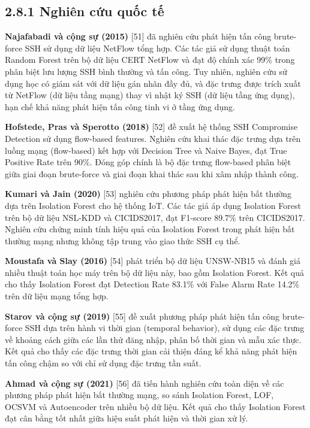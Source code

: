 \documentclass[
  a4paper]{report}
\begin{document}
\subsection{2.8.1 Nghiên cứu quốc
tế}\label{nghiuxean-cux1ee9u-quux1ed1c-tux1ebf}

\textbf{Najafabadi và cộng sự (2015)} {[}51{]} đã nghiên cứu phát hiện
tấn công brute-force SSH sử dụng dữ liệu NetFlow tổng hợp. Các tác giả
sử dụng thuật toán Random Forest trên bộ dữ liệu CERT NetFlow và đạt độ
chính xác 99\% trong phân biệt lưu lượng SSH bình thường và tấn công.
Tuy nhiên, nghiên cứu sử dụng học có giám sát với dữ liệu gán nhãn đầy
đủ, và đặc trưng được trích xuất từ NetFlow (dữ liệu tầng mạng) thay vì
nhật ký SSH (dữ liệu tầng ứng dụng), hạn chế khả năng phát hiện tấn công
tinh vi ở tầng ứng dụng.

\textbf{Hofstede, Pras và Sperotto (2018)} {[}52{]} đề xuất hệ thống SSH
Compromise Detection sử dụng flow-based features. Nghiên cứu khai thác
đặc trưng dựa trên luồng mạng (flow-based) kết hợp với Decision Tree và
Naive Bayes, đạt True Positive Rate trên 90\%. Đóng góp chính là bộ đặc
trưng flow-based phân biệt giữa giai đoạn brute-force và giai đoạn khai
thác sau khi xâm nhập thành công.

\textbf{Kumari và Jain (2020)} {[}53{]} nghiên cứu phương pháp phát hiện
bất thường dựa trên Isolation Forest cho hệ thống IoT. Các tác giả áp
dụng Isolation Forest trên bộ dữ liệu NSL-KDD và CICIDS2017, đạt
F1-score 89.7\% trên CICIDS2017. Nghiên cứu chứng minh tính hiệu quả của
Isolation Forest trong phát hiện bất thường mạng nhưng không tập trung
vào giao thức SSH cụ thể.

\textbf{Moustafa và Slay (2016)} {[}54{]} phát triển bộ dữ liệu
UNSW-NB15 và đánh giá nhiều thuật toán học máy trên bộ dữ liệu này, bao
gồm Isolation Forest. Kết quả cho thấy Isolation Forest đạt Detection
Rate 83.1\% với False Alarm Rate 14.2\% trên dữ liệu mạng tổng hợp.

\textbf{Starov và cộng sự (2019)} {[}55{]} đề xuất phương pháp phát hiện
tấn công brute-force SSH dựa trên hành vi thời gian (temporal behavior),
sử dụng các đặc trưng về khoảng cách giữa các lần thử đăng nhập, phân bố
thời gian và mẫu xác thực. Kết quả cho thấy các đặc trưng thời gian cải
thiện đáng kể khả năng phát hiện tấn công chậm so với chỉ sử dụng đặc
trưng tần suất.

\textbf{Ahmad và cộng sự (2021)} {[}56{]} đã tiến hành nghiên cứu toàn
diện về các phương pháp phát hiện bất thường mạng, so sánh Isolation
Forest, LOF, OCSVM và Autoencoder trên nhiều bộ dữ liệu. Kết quả cho
thấy Isolation Forest đạt cân bằng tốt nhất giữa hiệu suất phát hiện và
thời gian xử lý.
\end{document}
